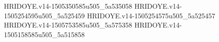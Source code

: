 HRIDOYE.v14-1505350585u505_5a535058
HRIDOYE.v14-1505254595u505_5a525459
HRIDOYE.v14-1505254575u505_5a525457
HRIDOYE.v14-1505753585u505_5a575358
HRIDOYE.v14-1505158585u505_5a515858
